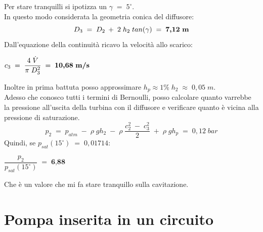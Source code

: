 \documentclass[a4paper, twoside, 12pt]{report}
\begin{document}
Per stare tranquilli si ipotizza un $\gamma\;=\;5^{\circ}$.\\
In questo modo considerata la geometria conica del diffusore:
\begin{equation}
	D_{3}\;=\;D_{2}\:+\;2\;h_{2}\;tan(\gamma)\;=\;\textbf{7,12\;m}
\end{equation}
Dall'equazione della continuità ricavo la velocità allo scarico:
\begin{center}
	$c_{3}\;=\;\dfrac{4\;\dot{V}}{\pi\;D_{3}^{2}}\;=\;\textbf{10,68\;m/s}$
\end{center}
Inoltre in prima battuta posso approssimare $h_{p}\approx1\%\;h_{2}\;\approx\;0,05\;m$.\\
Adesso che conosco tutti i termini di Bernoulli, posso calcolare quanto varrebbe la pressione all'uscita della turbina con il diffusore e verificare quanto è vicina alla pressione di saturazione.
\begin{equation}
	p_{2}\;=\;p_{atm}\;-\;\rho\;gh_{2}\;-\;\rho\;\dfrac{c_{2}^{2}\;-\;c_{3}^{2}}{2}\;+\;\rho\;gh_{p}\;=\;0,12\;bar
\end{equation}
Quindi, se $p_{sat}(15^{\circ})\;=\;0,01714$:
\begin{center}
	$\dfrac{p_{2}}{p_{sat}(15^{\circ})}\;=\;\textbf{6,88}$
\end{center}
Che è un valore che mi fa stare tranquillo sulla cavitazione.

\chapter{Pompa inserita in un circuito}
\end{document}
